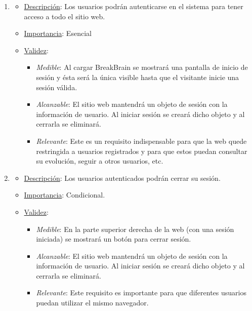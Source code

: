 \begin{enumerate}
\item %
  \begin{itemize}
  \item \underline{Descripción}: Los usuarios podrán autenticarse en el sistema para tener acceso a todo el sitio web.
  \item \underline{Importancia}: Esencial
  \item \underline{Validez}:
    \begin{itemize}
    \item \textit{Medible}: Al cargar BreakBrain se mostrará una pantalla de inicio de sesión y ésta será la única visible hasta que el visitante inicie una sesión válida.
    \item \textit{Alcanzable}: El sitio web mantendrá un objeto de sesión con la información de usuario. Al iniciar sesión se creará dicho objeto y al cerrarla se eliminará.
    \item \textit{Relevante}: Este es un requisito indispensable para que la web quede restringida a usuarios registrados y para que estos puedan consultar su evolución, seguir a otros usuarios, etc.
    \end{itemize}
  \end{itemize}

\item %
  \begin{itemize}
  \item \underline{Descripción}: Los usuarios autenticados podrán cerrar su sesión.
  \item \underline{Importancia}: Condicional.
  \item \underline{Validez}:
    \begin{itemize}
    \item \textit{Medible}: En la parte superior derecha de la web (con una sesión iniciada) se mostrará un botón para cerrar sesión.
    \item \textit{Alcanzable}: El sitio web mantendrá un objeto de sesión con la información de usuario. Al iniciar sesión se creará dicho objeto y al cerrarla se eliminará.
    \item \textit{Relevante}: Este requisito es importante para que diferentes usuarios puedan utilizar el mismo navegador.
    \end{itemize}
  \end{itemize}


\end{enumerate}
